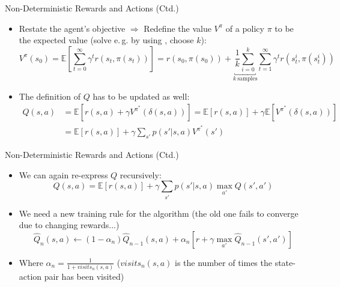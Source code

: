 \begin{frame}{Non-Deterministic Rewards and Actions (Ctd.)}{}
	\begin{itemize}
		\item Restate the agent's objective $\Rightarrow$ Redefine the value $V^{\pi}$ of a policy $\pi$
			to be the expected value (solve e.\,g. by using , choose $k$):
		\begin{equation*}
			V^{\pi}(s_0) 	= \mathbb{E}\left[ \sum_{t=0}^{\infty} \gamma^t r(s_t, \pi(s_t)) \right]
							= r(s_0, \pi(s_0)) + \underbracket{\frac{1}{k} \sum_{i=0}^k}_{k\ \text{samples}}
							 	\sum_{t=1}^{\infty} \gamma^t r(s_t^i, \pi(s_t^i))
		\end{equation*}
		\item The definition of $Q$ has to be updated as well:
		\begin{align*}
			Q(s, a) 	&= \mathbb{E}[r(s, a) + \gamma V^{\pi^*}(\delta(s, a))]
					  = \mathbb{E}[r(s, a)] + \gamma \mathbb{E}[V^{\pi^*}(\delta(s, a))] \\
					&= \mathbb{E}[r(s, a)] + \gamma \sum_{s'} p(s' \vert s, a) V^{\pi^*}(s')
		\end{align*}
	\end{itemize}
\end{frame}


\begin{frame}{Non-Deterministic Rewards and Actions (Ctd.)}{}
	\begin{itemize}
		\item We can again re-express $Q$ recursively:
		\begin{equation}
			Q(s, a) = \mathbb{E}[r(s, a)] + \gamma \sum_{s'} p(s' \vert s, a) \max_{a'} Q(s', a')
		\end{equation}
		\item We need a new training rule for the algorithm (the old one fails to converge due to changing rewards...)
		\begin{equation}
			\widehat{Q}_n(s, a) \longleftarrow (1 - \alpha_n) \widehat{Q}_{n-1}(s, a) + \alpha_n[r + \gamma \max_{a'}
				\widehat{Q}_{n-1}(s', a')]
		\end{equation}
		\item Where $\alpha_n = \frac{1}{1 + visits_n(s, a)}$
			($visits_n(s, a)$ is the number of times the state-action pair has been visited)
	\end{itemize}
\end{frame}


